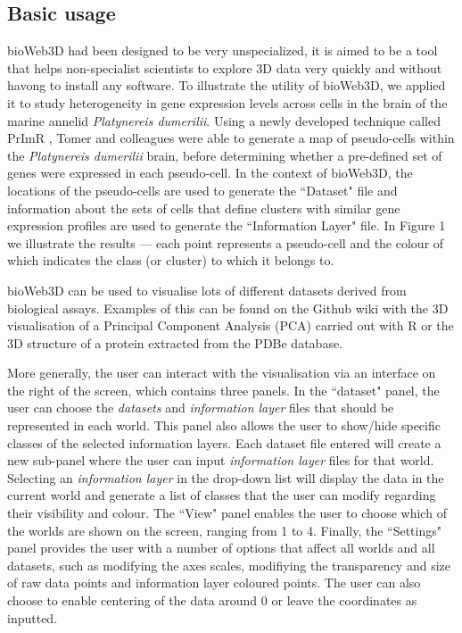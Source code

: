 \documentclass[10pt]{bmc_article}
\newenvironment{bmcformat}{\baselineskip20pt\sloppy\setboolean{publ}{false}}{\baselineskip20pt\sloppy}
\begin{document}
\begin{bmcformat}
	\subsection{Basic usage}
	bioWeb3D had been designed to be very unspecialized, it is aimed to be a tool that helps non-specialist scientists to explore 3D data very quickly and without havong to install any software.
	To illustrate the utility of bioWeb3D, we applied it to study heterogeneity in gene expression levels across cells in the brain of the marine annelid {\it{Platynereis dumerilii}}. Using a newly developed technique called PrImR \cite{Tomer10}, Tomer and colleagues were able to generate a map of pseudo-cells within the {\it{Platynereis dumerilii}} brain, before determining whether a pre-defined set of genes were expressed in each pseudo-cell. In the context of bioWeb3D, the locations of the pseudo-cells are used to generate the ``Dataset" file and information about the sets of cells that define clusters with similar gene expression profiles are used to generate the ``Information Layer" file. In Figure 1 we illustrate the results ---  each point represents a pseudo-cell and the colour of which indicates the class (or cluster) to which it belongs to. 

	bioWeb3D can be used to visualise lots of different datasets derived from biological assays. Examples of this can be found on the Github wiki \cite{github} with the 3D visualisation of a Principal Component Analysis (PCA) carried out with R or the 3D structure of a protein extracted from the PDBe database.
	
	More generally, the user can interact with the visualisation via an interface on the right of the screen, which contains three panels. In the ``dataset" panel, the user can choose the {\it{datasets}} and {\it{information layer}} files that should be represented in each world. This panel also allows the user to show/hide specific classes of the selected information layers. Each dataset file entered will create a new sub-panel where the user can input {\it{information layer}} files for that world. Selecting an {\it{information layer}} in the drop-down list will display the data in the current world and generate a list of classes that the user can modify regarding their visibility and colour. The ``View" panel enables the user to choose which of the worlds are shown on the screen, ranging from 1 to 4. Finally, the ``Settings" panel provides the user with a number of options that affect all worlds and all datasets, such as modifying the axes scales, modifiying the transparency and size of raw data points and information layer coloured points. The user can also choose to enable centering of the data around 0 or leave the coordinates as inputted.


\end{bmcformat}
\end{document}
